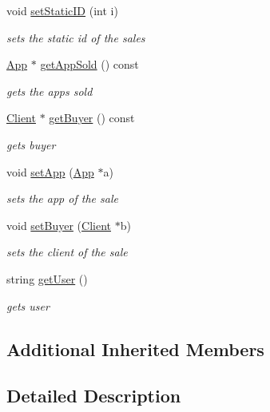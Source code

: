 \begin{DoxyCompactItemize}
void \hyperlink{class_sale_a5143d0d8e6087109520a535d7a769209}{set\-Static\-I\-D} (int i)
\begin{DoxyCompactList}\small\item\em sets the static id of the sales \end{DoxyCompactList}\item 
\hyperlink{class_app}{App} $\ast$ \hyperlink{class_sale_aefd7c85fd4f0980df644930847550bda}{get\-App\-Sold} () const 
\begin{DoxyCompactList}\small\item\em gets the apps sold \end{DoxyCompactList}\item 
\hyperlink{class_client}{Client} $\ast$ \hyperlink{class_sale_ae1297eab9aa661a5f1b578c7b560faf7}{get\-Buyer} () const 
\begin{DoxyCompactList}\small\item\em gets buyer \end{DoxyCompactList}\item 
void \hyperlink{class_sale_ab058f26afd2ae7f1638f89f8864363bb}{set\-App} (\hyperlink{class_app}{App} $\ast$a)
\begin{DoxyCompactList}\small\item\em sets the app of the sale \end{DoxyCompactList}\item 
void \hyperlink{class_sale_a533bcb3c6d71bb6db576731c5e714b93}{set\-Buyer} (\hyperlink{class_client}{Client} $\ast$b)
\begin{DoxyCompactList}\small\item\em sets the client of the sale \end{DoxyCompactList}\item 
string \hyperlink{class_sale_a8b01a1de2c4c2e5b979eff08db88132a}{get\-User} ()
\begin{DoxyCompactList}\small\item\em gets user \end{DoxyCompactList}\end{DoxyCompactItemize}
\subsection*{Additional Inherited Members}


\subsection{Detailed Description}


